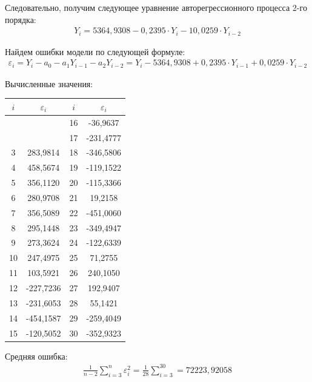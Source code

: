 \documentclass[utf8, a4paper, 14pt, russian, oneside]{book}
\begin{document}
Следовательно, получим следующее уравнение авторегрессионного процесса 2-го порядка:
\begin{gather*}
    Y_i = 5364,9308-0,2395\cdot Y_i-1 0,0259\cdot Y_{i-2}
\end{gather*}

Найдем ошибки модели по следующей формуле:
\begin{gather*}
    \varepsilon_i = Y_i - a_0 - a_1Y_{i-1} - a_2Y_{i-2} = Y_i - 5364,9308 + 0,2395\cdot Y_{i-1} + 0,0259\cdot Y_{i-2}
\end{gather*}

Вычисленные значения:
\begin{table}[h!]
    \centering
    \begin{tabular}{|c|c|c|c|}
        \hline
        $i$ & $\varepsilon_i$ & $i$ & $\varepsilon_i$ \\ \hline
           &           & 16 & -36,9637  \\ \hline
           &           & 17 & -231,4777 \\ \hline
        3  & 283,9814  & 18 & -346,5806 \\ \hline
        4  & 458,5674  & 19 & -119,1522 \\ \hline
        5  & 356,1120  & 20 & -115,3366 \\ \hline
        6  & 280,9708  & 21 & 19,2158   \\ \hline
        7  & 356,5089  & 22 & -451,0060 \\ \hline
        8  & 295,1448  & 23 & -349,4947 \\ \hline
        9  & 273,3624  & 24 & -122,6339 \\ \hline
        10 & 247,4975  & 25 & 71,2755   \\ \hline
        11 & 103,5921  & 26 & 240,1050  \\ \hline
        12 & -227,7236 & 27 & 192,9407  \\ \hline
        13 & -231,6053 & 28 & 55,1421   \\ \hline
        14 & -454,1587 & 29 & -259,4049 \\ \hline
        15 & -120,5052 & 30 & -352,9323 \\ \hline
    \end{tabular} 
\end{table}

Средняя ошибка:
\begin{gather*}
    \frac{1}{n-2}\sum_{i=3}^n\varepsilon_i^2 = \frac{1}{28} \sum_{i=3}^{30} = 72223,92058 
\end{gather*}
\end{document}
